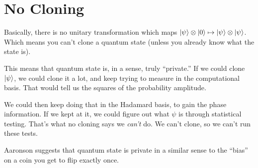 \section{No Cloning}

\begin{remark}
  Basically, there is no unitary transformation which maps
  $|\psi\rangle \otimes |0\rangle \mapsto |\psi\rangle \otimes
  |\psi\rangle$. Which means you can't clone a quantum state (unless
  you already know what the state is).

  This means that quantum state is, in a sense, truly ``private.'' If we
  could clone $|\psi\rangle$, we could clone it a lot, and keep trying
  to measure in the computational basis. That would tell us the squares
  of the probability amplitude.

  We could then keep doing that in the Hadamard basis, to gain the phase
  information. If we kept at it, we could figure out what $\psi$ is
  through statistical testing. That's what no cloning says we
  \emph{can't} do. We can't clone, so we can't run these tests.

  Aaronson suggests that quantum state is private in a similar sense to
  the ``bias'' on a coin you get to flip exactly once.
\end{remark}
